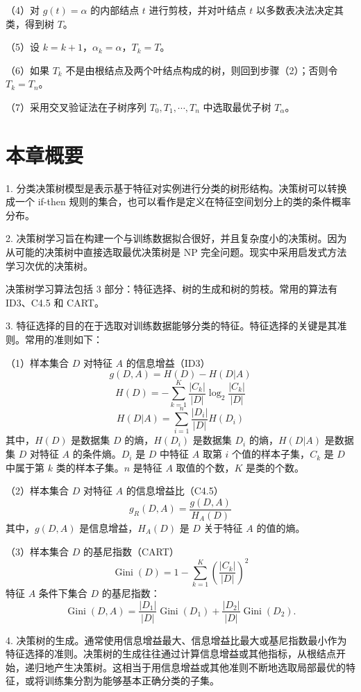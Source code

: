 \documentclass[UTF8, 12pt, fontset=fandol, oneside]{ctexart}
\begin{document}
（4）对 $g(t)=\alpha$ 的内部结点 $t$ 进行剪枝，并对叶结点 $t$ 以多数表决法决定其类，得到树 $T$。

（5）设 $k=k+1$，$\alpha_k=\alpha$，$T_k=T$。

（6）如果 $T_k$ 不是由根结点及两个叶结点构成的树，则回到步骤（2）；否则令 $T_k=T_n$。

（7）采用交叉验证法在子树序列 $T_0,T_1,\cdots,T_n$ 中选取最优子树 $T_\alpha$。

\section*{本章概要}

1. 分类决策树模型是表示基于特征对实例进行分类的树形结构。决策树可以转换成一个 if-then 规则的集合，也可以看作是定义在特征空间划分上的类的条件概率分布。

2. 决策树学习旨在构建一个与训练数据拟合很好，并且复杂度小的决策树。因为从可能的决策树中直接选取最优决策树是 NP 完全问题。现实中采用启发式方法学习次优的决策树。

决策树学习算法包括 3 部分：特征选择、树的生成和树的剪枝。常用的算法有 ID3、C4.5 和 CART。

3. 特征选择的目的在于选取对训练数据能够分类的特征。特征选择的关键是其准则。常用的准则如下：

（1）样本集合 $D$ 对特征 $A$ 的信息增益（ID3）
\[
  g(D,A)=H(D)-H(D|A)
\]
\[
  H(D)=-\sum_{k=1}^{K}\frac{|C_k|}{|D|}\log_2\frac{|C_k|}{|D|}
\]
\[
  H(D|A)=\sum_{i=1}^{n}\frac{|D_i|}{|D|}H(D_i)
\]
其中，$H(D)$ 是数据集 $D$ 的熵，$H(D_i)$ 是数据集 $D_i$ 的熵，$H(D|A)$ 是数据集 $D$ 对特征 $A$ 的条件熵。$D_i$ 是 $D$ 中特征 $A$ 取第 $i$ 个值的样本子集，$C_k$ 是 $D$ 中属于第 $k$ 类的样本子集。$n$ 是特征 $A$ 取值的个数，$K$ 是类的个数。

（2）样本集合 $D$ 对特征 $A$ 的信息增益比（C4.5）
\[
  g_R(D,A)=\frac{g(D,A)}{H_A(D)}
\]
其中，$g(D,A)$ 是信息增益，$H_A(D)$ 是 $D$ 关于特征 $A$ 的值的熵。

（3）样本集合 $D$ 的基尼指数（CART）
\[
  \operatorname{Gini}(D)=1-\sum_{k=1}^{K}\left(\frac{|C_k|}{|D|}\right)^2
\]
特征 $A$ 条件下集合 $D$ 的基尼指数：
\[
  \operatorname{Gini}(D,A)=\frac{|D_1|}{|D|}\operatorname{Gini}(D_1)
  +\frac{|D_2|}{|D|}\operatorname{Gini}(D_2).
\]

4. 决策树的生成。通常使用信息增益最大、信息增益比最大或基尼指数最小作为特征选择的准则。决策树的生成往往通过计算信息增益或其他指标，从根结点开始，递归地产生决策树。这相当于用信息增益或其他准则不断地选取局部最优的特征，或将训练集分割为能够基本正确分类的子集。
\end{document}
